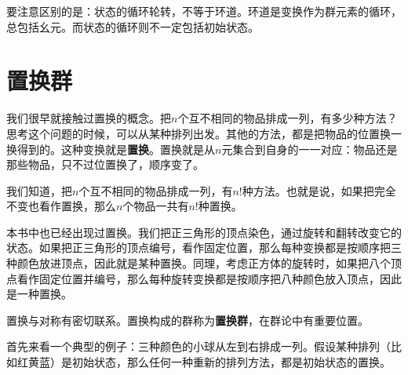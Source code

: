 \documentclass[12pt,UTF8,fontset=none]{ctexbook}
\begin{document}
要注意区别的是：状态的循环轮转，不等于环道。环道是变换作为群元素的循环，总包括幺元。而状态的循环则不一定包括初始状态。

\section{置换群}

我们很早就接触过置换的概念。把$n$个互不相同的物品排成一列，有多少种方法？思考这个问题的时候，可以从某种排列出发。其他的方法，都是把物品的位置换一换得到的。这种变换就是\textbf{置换}。置换就是从$n$元集合到自身的一一对应：物品还是那些物品，只不过位置换了，顺序变了。

我们知道，把$n$个互不相同的物品排成一列，有$n!$种方法。也就是说，如果把完全不变也看作置换，那么$n$个物品一共有$n!$种置换。

本书中也已经出现过置换。我们把正三角形的顶点染色，通过旋转和翻转改变它的状态。如果把正三角形的顶点编号，看作固定位置，那么每种变换都是按顺序把三种颜色放进顶点，因此就是某种置换。同理，考虑正方体的旋转时，如果把八个顶点看作固定位置并编号，那么每种旋转变换都是按顺序把八种颜色放入顶点，因此是一种置换。

置换与对称有密切联系。置换构成的群称为\textbf{置换群}，在群论中有重要位置。

首先来看一个典型的例子：三种颜色的小球从左到右排成一列。假设某种排列（比如红黄蓝）是初始状态，那么任何一种重新的排列方法，都是初始状态的置换。
\end{document}
